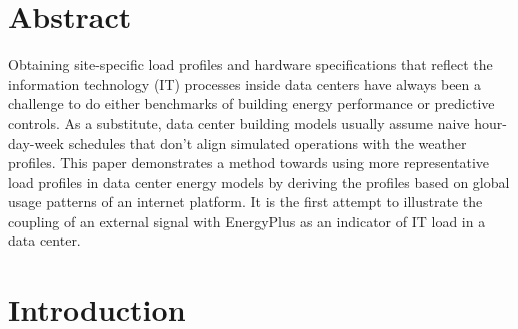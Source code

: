 
\section*{Abstract}	%

\addtocounter{section}{1}


Obtaining site-specific load profiles and hardware specifications that reflect the information technology (IT) processes inside data centers have always been a challenge to do either benchmarks of building energy performance or predictive controls. As a substitute, data center building models usually assume naive hour-day-week schedules that don't align simulated operations with the weather profiles. 
This paper demonstrates a method towards using more representative load profiles in data center energy models by deriving the profiles based on global usage patterns of an internet platform. It is the first attempt to illustrate the coupling of an external signal with EnergyPlus as an indicator of IT load in a data center. 

\section*{Introduction}

